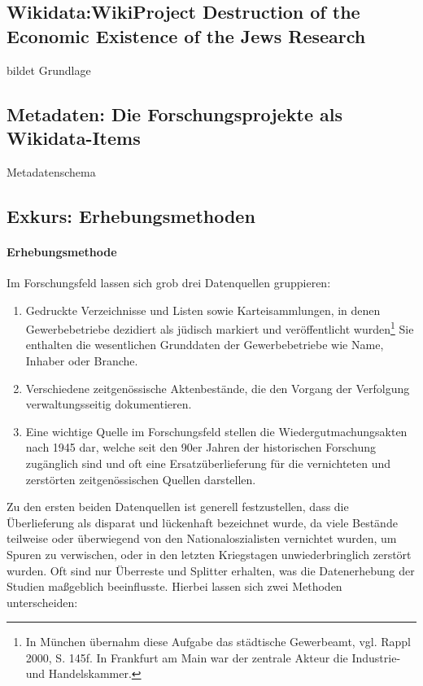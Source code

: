\subsection{Wikidata:WikiProject Destruction of the Economic Existence of the Jews Research}
bildet Grundlage

\subsection{Metadaten: Die Forschungsprojekte als Wikidata-Items}
Metadatenschema
\subsection{Exkurs: Erhebungsmethoden}

\paragraph{Erhebungsmethode} Im Forschungsfeld lassen sich grob drei Datenquellen gruppieren:

\begin{enumerate}
    \item Gedruckte Verzeichnisse und Listen sowie Karteisammlungen, in denen Gewerbebetriebe dezidiert als jüdisch markiert und veröffentlicht wurden\footnote{In München übernahm diese Aufgabe das städtische Gewerbeamt, vgl. Rappl 2000, S. 145f. In Frankfurt am Main war der zentrale Akteur die Industrie- und Handelskammer.} Sie enthalten die wesentlichen Grunddaten der Gewerbebetriebe wie Name, Inhaber oder Branche.
    \item Verschiedene zeitgenössische Aktenbestände, die den Vorgang der Verfolgung verwaltungsseitig dokumentieren. 
    \item Eine wichtige Quelle im Forschungsfeld stellen die Wiedergutmachungsakten nach 1945 dar, welche seit den 90er Jahren der historischen Forschung zugänglich sind und oft eine Ersatzüberlieferung für die vernichteten und zerstörten zeitgenössischen Quellen darstellen.     
\end{enumerate}

Zu den ersten beiden Datenquellen ist generell festzustellen, dass die Überlieferung als disparat und lückenhaft bezeichnet wurde, da viele Bestände teilweise oder überwiegend von den Nationaloszialisten vernichtet wurden, um Spuren zu verwischen, oder in den letzten Kriegstagen unwiederbringlich zerstört wurden. Oft sind nur Überreste und Splitter erhalten, was die Datenerhebung der Studien maßgeblich beeinflusste. Hierbei lassen sich zwei Methoden unterscheiden:


